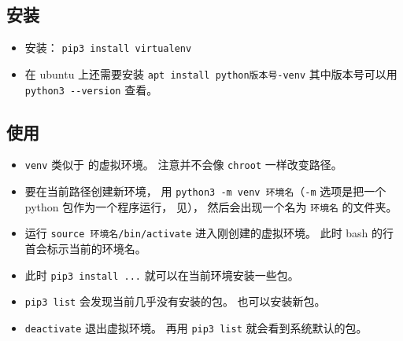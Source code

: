 

\begin{issues}
\issueDraft
\end{issues}


\subsection{安装}
\begin{itemize}
\item 安装： \verb|pip3 install virtualenv|
\item 在 ubuntu 上还需要安装 \verb|apt install python版本号-venv| 其中版本号可以用 \verb|python3 --version| 查看。
\end{itemize}

\subsection{使用}
\begin{itemize}
\item \verb|venv| 类似于  的虚拟环境。 注意并不会像 \verb|chroot| 一样改变路径。
\item 要在当前路径创建新环境， 用 \verb|python3 -m venv 环境名|（\verb|-m| 选项是把一个 python 包作为一个程序运行， 见）， 然后会出现一个名为 \verb|环境名| 的文件夹。
\item 运行 \verb|source 环境名/bin/activate| 进入刚创建的虚拟环境。 此时 bash 的行首会标示当前的环境名。
\item 此时 \verb|pip3 install ...| 就可以在当前环境安装一些包。
\item \verb|pip3 list| 会发现当前几乎没有安装的包。 也可以安装新包。
\item \verb|deactivate| 退出虚拟环境。 再用 \verb|pip3 list| 就会看到系统默认的包。
\end{itemize}
